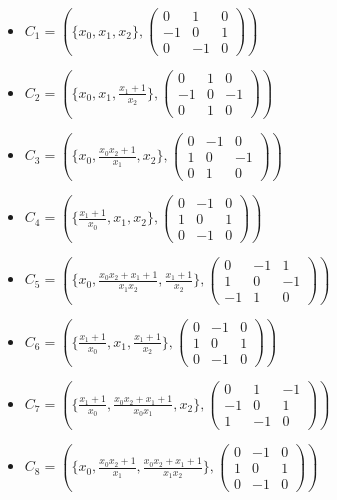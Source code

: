 \documentclass[12pt,a4paper]{article}
\begin{document}
\begin{itemize}
    \item[] $C_1 = \left( \{x_0, x_1, x_2\}, \begin{pmatrix} 0 & 1 & 0 \\ -1 & 0 & 1 \\ 0 & -1 & 0 \end{pmatrix} \right)$
    \item[] $C_2 = \left( \{x_0, x_1, \frac{x_1+1}{x_2}\}, \begin{pmatrix} 0 & 1 & 0 \\ -1 & 0 & -1 \\ 0 & 1 & 0 \end{pmatrix} \right)$
    \item[] $C_3 = \left( \{x_0, \frac{x_0x_2+1}{x_1}, x_2\}, \begin{pmatrix} 0 & -1 & 0 \\ 1 & 0 & -1 \\ 0 & 1 & 0 \end{pmatrix} \right)$
    \item[] $C_4 = \left( \{\frac{x_1+1}{x_0}, x_1, x_2\}, \begin{pmatrix} 0 & -1 & 0 \\ 1 & 0 & 1 \\ 0 & -1 & 0 \end{pmatrix} \right)$
    \item[] $C_5 = \left( \{x_0, \frac{x_0x_2+x_1+1}{x_1x_2}, \frac{x_1+1}{x_2}\}, \begin{pmatrix} 0 & -1 & 1 \\ 1 & 0 & -1 \\ -1 & 1 & 0 \end{pmatrix} \right)$
    \item[] $C_6 = \left( \{\frac{x_1+1}{x_0}, x_1, \frac{x_1+1}{x_2}\}, \begin{pmatrix} 0 & -1 & 0 \\ 1 & 0 & 1 \\ 0 & -1 & 0 \end{pmatrix} \right)$
    \item[] $C_7 = \left( \{\frac{x_1+1}{x_0}, \frac{x_0x_2+x_1+1}{x_0x_1}, x_2\}, \begin{pmatrix} 0 & 1 & -1 \\ -1 & 0 & 1 \\ 1 & -1 & 0 \end{pmatrix} \right)$
    \item[] $C_8 = \left( \{x_0, \frac{x_0x_2+1}{x_1}, \frac{x_0x_2+x_1+1}{x_1x_2}\}, \begin{pmatrix} 0 & -1 & 0 \\ 1 & 0 & 1 \\ 0 & -1 & 0 \end{pmatrix} \right)$

\end{itemize}
\end{document}
